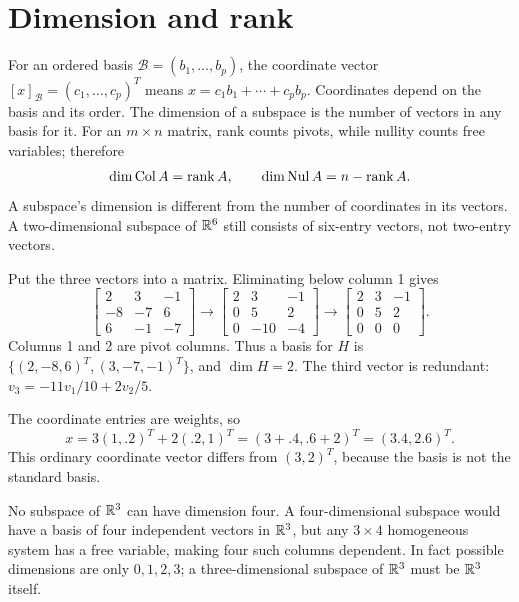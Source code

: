 \section{Dimension and rank}
For an ordered basis $\mathcal B=(b_1,\ldots,b_p)$, the coordinate vector
$[x]_{\mathcal B}=(c_1,\ldots,c_p)^T$ means
$x=c_1b_1+\cdots+c_pb_p$. Coordinates depend on the basis and its order.
The dimension of a subspace is the number of vectors in any basis for it.
For an $m\times n$ matrix, rank counts pivots, while nullity counts free
variables; therefore
\[
 \dim\operatorname{Col} A=\operatorname{rank} A,\qquad \dim\operatorname{Nul} A=n-\operatorname{rank} A.
\]
A subspace's dimension is different from the number of coordinates in
its vectors. A two-dimensional subspace of $\mathbb{R}^6$ still consists of
six-entry vectors, not two-entry vectors.

Put the three vectors into a matrix. Eliminating below column 1 gives
\[
 \begin{bmatrix}2&3&-1\\-8&-7&6\\6&-1&-7\end{bmatrix}
 \longrightarrow
 \begin{bmatrix}2&3&-1\\0&5&2\\0&-10&-4\end{bmatrix}
 \longrightarrow
 \begin{bmatrix}2&3&-1\\0&5&2\\0&0&0\end{bmatrix}.
\]
Columns 1 and 2 are pivot columns. Thus a basis for $H$ is
$\{(2,-8,6)^T,(3,-7,-1)^T\}$, and $\dim H=2$.
The third vector is redundant: $v_3=-11v_1/10+2v_2/5$.

The coordinate entries are weights, so
\[
 x=3(1,.2)^T+2(.2,1)^T=(3+.4,.6+2)^T=(3.4,2.6)^T.
\]
This ordinary coordinate vector differs from $(3,2)^T$, because the
basis is not the standard basis.

No subspace of $\mathbb{R}^3$ can have dimension four.
A four-dimensional subspace would have a basis of four independent vectors
in $\mathbb{R}^3$, but any $3\times4$ homogeneous system has a free variable,
making four such columns dependent. In fact possible dimensions are only
$0,1,2,3$; a three-dimensional subspace of $\mathbb{R}^3$ must be $\mathbb{R}^3$ itself.

